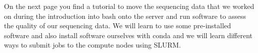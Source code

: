 \documentclass[
  letterpaper,
  DIV=11,
  numbers=noendperiod]{scrreprt}
\begin{document}
On the next page you find a tutorial to move the sequencing data that we
worked on during the introduction into bash onto the server and run
software to assess the quality of our sequencing data. We will learn to
use some pre-installed software and also install software ourselves with
conda and we will learn different ways to submit jobs to the compute
nodes using SLURM.
\end{document}

